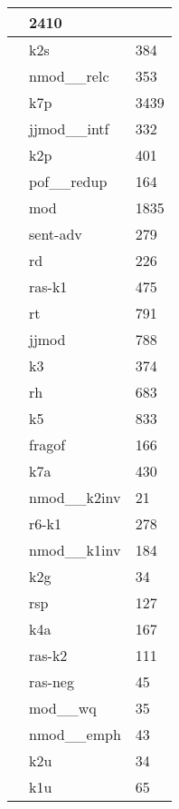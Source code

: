 \documentclass[a4 paper]{article}
\begin{document}
\begin{longtable}{cp{}p{}}
 & 2410\\ \midrule  & k2s & 384\\ \midrule  & nmod\_\_relc & 353\\ \midrule  & k7p & 3439\\ \midrule  & jjmod\_\_intf & 332\\ \midrule  & k2p & 401\\ \midrule  & pof\_\_redup & 164\\ \midrule  & mod & 1835\\ \midrule  & sent-adv & 279\\ \midrule  & rd & 226\\ \midrule  & ras-k1 & 475\\ \midrule  & rt & 791\\ \midrule  & jjmod & 788\\ \midrule  & k3 & 374\\ \midrule  & rh & 683\\ \midrule  & k5 & 833\\ \midrule  & fragof & 166\\ \midrule  & k7a & 430\\ \midrule  & nmod\_\_k2inv & 21\\ \midrule  & r6-k1 & 278\\ \midrule  & nmod\_\_k1inv & 184\\ \midrule  & k2g & 34\\ \midrule  & rsp & 127\\ \midrule  & k4a & 167\\ \midrule  & ras-k2 & 111\\ \midrule  & ras-neg & 45\\ \midrule  & mod\_\_wq & 35\\ \midrule  & nmod\_\_emph & 43\\ \midrule  & k2u & 34\\ \midrule  & k1u & 65\\ 
\end{longtable}
\end{document}
